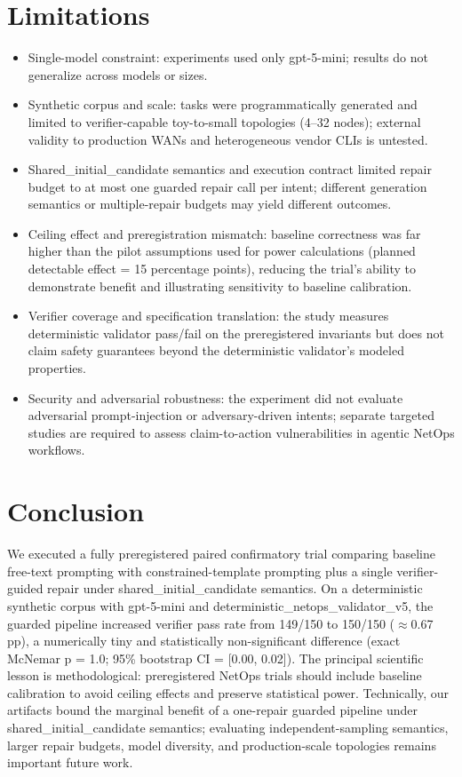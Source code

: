 \documentclass[conference]{IEEEtran}
\begin{document}
\section{Limitations}
\begin{itemize}
\item Single-model constraint: experiments used only gpt-5-mini; results do not generalize across models or sizes.
\item Synthetic corpus and scale: tasks were programmatically generated and limited to verifier-capable toy-to-small topologies (4--32 nodes); external validity to production WANs and heterogeneous vendor CLIs is untested.
\item Shared\_initial\_candidate semantics and execution contract limited repair budget to at most one guarded repair call per intent; different generation semantics or multiple-repair budgets may yield different outcomes.
\item Ceiling effect and preregistration mismatch: baseline correctness was far higher than the pilot assumptions used for power calculations (planned detectable effect = 15 percentage points), reducing the trial's ability to demonstrate benefit and illustrating sensitivity to baseline calibration.
\item Verifier coverage and specification translation: the study measures deterministic validator pass/fail on the preregistered invariants but does not claim safety guarantees beyond the deterministic validator's modeled properties.
\item Security and adversarial robustness: the experiment did not evaluate adversarial prompt-injection or adversary-driven intents; separate targeted studies are required to assess claim-to-action vulnerabilities in agentic NetOps workflows.
\end{itemize}

\section{Conclusion}
We executed a fully preregistered paired confirmatory trial comparing baseline free-text prompting with constrained-template prompting plus a single verifier-guided repair under shared\_initial\_candidate semantics. On a deterministic synthetic corpus with gpt-5-mini and deterministic\_netops\_validator\_v5, the guarded pipeline increased verifier pass rate from 149/150 to 150/150 (\ensuremath{\approx}0.67 pp), a numerically tiny and statistically non-significant difference (exact McNemar p = 1.0; 95\% bootstrap CI = [0.00, 0.02]). The principal scientific lesson is methodological: preregistered NetOps trials should include baseline calibration to avoid ceiling effects and preserve statistical power. Technically, our artifacts bound the marginal benefit of a one-repair guarded pipeline under shared\_initial\_candidate semantics; evaluating independent-sampling semantics, larger repair budgets, model diversity, and production-scale topologies remains important future work.
\end{document}
